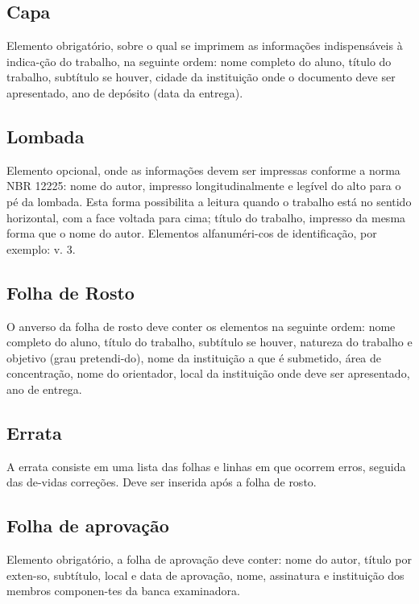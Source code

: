 \subsection{Capa}

Elemento obrigat\'{o}rio, sobre o qual se imprimem as informa\c{c}ões
indispensáveis \`{a} indica-\c{c}ão do trabalho, na seguinte ordem: nome completo do aluno, título do trabalho, subtítulo se houver, cidade da institui\c{c}ão onde o documento deve ser apresentado, ano de dep\'{o}sito (data da entrega).

\subsection{Lombada}

Elemento opcional, onde as informa\c{c}ões devem ser impressas
conforme a norma NBR 12225: nome do autor, impresso longitudinalmente e legível do alto para o p\'{e} da lombada. Esta forma possibilita a leitura quando o trabalho está no sentido horizontal, com a face voltada para cima; título do trabalho, impresso da mesma forma que o nome do autor. Elementos alfanum\'{e}ri-cos de identifica\c{c}ão, por exemplo: v. 3.

\subsection{Folha de Rosto}

O anverso da folha de rosto deve conter os elementos na seguinte
ordem: nome completo do aluno, título do trabalho, subtítulo se houver, natureza do trabalho e objetivo (grau pretendi-do), nome da institui\c{c}ão a que \'{e} submetido, área de concentra\c{c}ão, nome do orientador, local da institui\c{c}ão onde deve ser apresentado, ano de entrega.

\subsection{Errata}

A errata consiste em uma lista das folhas e linhas em que ocorrem
erros, seguida das de-vidas corre\c{c}ões. Deve ser inserida ap\'{o}s a folha de rosto.

\subsection{Folha de aprova\c{c}ão}

Elemento obrigat\'{o}rio, a folha de aprova\c{c}ão deve conter: nome do
autor, título por exten-so, subtítulo, local e data de aprova\c{c}ão, nome, assinatura e institui\c{c}ão dos membros componen-tes da banca examinadora.

